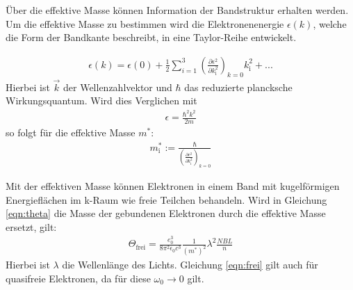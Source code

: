 Über die effektive Masse können Information der Bandstruktur erhalten werden.
Um die effektive Masse zu bestimmen wird die Elektronenenergie $\epsilon (k)$,
welche die Form der Bandkante beschreibt, in eine Taylor-Reihe entwickelt.

\begin{align}
  \epsilon(k) = \epsilon (0) + \frac{1}{2} \sum_{i=1}^3 \left(\frac{\partial \epsilon^2}{\partial k^2_{\mathrm{i}}}\right)_{k=0} k_{\mathrm{i}}^2 + ...
\end{align}
Hierbei ist $\vec{k}$ der Wellenzahlvektor und $\hbar$ das reduzierte plancksche Wirkungsquantum.
Wird dies Verglichen mit
\begin{align}
  \epsilon = \frac{\hbar^2 k^2}{2m}
\end{align}
so folgt für die effektive Masse $m^*$:
\begin{align}
  m^*_{\mathrm{i}} := \frac{\hbar}{\left(\frac{\partial \epsilon^2}{\partial k^2_{\mathrm{i}}}\right)_{k=0}}
\end{align}

Mit der effektiven Masse können Elektronen in einem Band mit kugelförmigen
Energieflächen im k-Raum wie freie Teilchen behandeln.
Wird in Gleichung \ref{eqn:theta} die Masse der gebundenen Elektronen durch die effektive Masse ersetzt, gilt:
\begin{align}
  \Theta_{\mathrm{frei}} = \frac{e^3_0}{8 \pi^2 \epsilon_0 c^3}\frac{1}{\left(m^{*}\right)^2} \lambda^2 \frac{NBL}{n} \label{eqn:frei}
\end{align}
Hierbei ist $\lambda$ die Wellenlänge des Lichts.
Gleichung \ref{eqn:frei} gilt auch für quasifreie Elektronen, da für diese $\omega_0 \rightarrow 0$ gilt.

